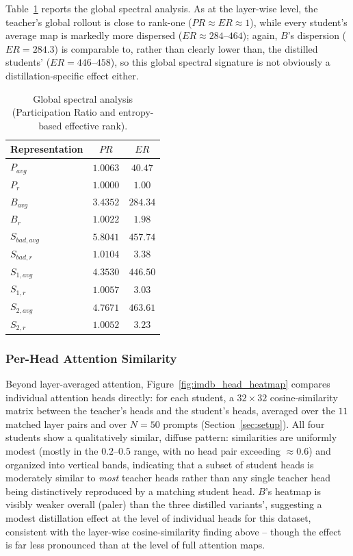 \documentclass[conference]{IEEEtran}
\begin{document}
Table~\ref{tab:imdb_global_spectral} reports the global spectral analysis. As at the layer-wise level, the teacher's global rollout is close to rank-one ($PR\approx ER\approx1$), while every student's average map is markedly more dispersed ($ER\approx284$--$464$); again, $B$'s dispersion ($ER=284.3$) is comparable to, rather than clearly lower than, the distilled students' ($ER=446$--$458$), so this global spectral signature is not obviously a distillation-specific effect either.

\begin{table}[h!]
\centering
\caption{Global spectral analysis (Participation Ratio and entropy-based effective rank).}
\begin{tabular}{|l|c|c|}
        \hline
        Representation & $PR$ & $ER$ \\
        \hline
        $P_{avg}$ & $1.0063$ & $40.47$ \\
        $P_r$ & $1.0000$ & $1.00$ \\
        $B_{avg}$ & $3.4352$ & $284.34$ \\
        $B_r$ & $1.0022$ & $1.98$ \\
        $S_{bad,avg}$ & $5.8041$ & $457.74$ \\
        $S_{bad,r}$ & $1.0104$ & $3.38$ \\
        $S_{1,avg}$ & $4.3530$ & $446.50$ \\
        $S_{1,r}$ & $1.0057$ & $3.03$ \\
        $S_{2,avg}$ & $4.7671$ & $463.61$ \\
        $S_{2,r}$ & $1.0052$ & $3.23$ \\
        \hline
    \end{tabular}
    \label{tab:imdb_global_spectral}
\end{table}

\subsubsection{Per-Head Attention Similarity}\label{sec:head-heatmaps}

Beyond layer-averaged attention, Figure~\ref{fig:imdb_head_heatmap} compares individual attention heads directly: for each student, a $32\times32$ cosine-similarity matrix between the teacher's heads and the student's heads, averaged over the $11$ matched layer pairs and over $N=50$ prompts (Section~\ref{sec:setup}). All four students show a qualitatively similar, diffuse pattern: similarities are uniformly modest (mostly in the $0.2$--$0.5$ range, with no head pair exceeding $\approx0.6$) and organized into vertical bands, indicating that a subset of student heads is moderately similar to \emph{most} teacher heads rather than any single teacher head being distinctively reproduced by a matching student head. $B$'s heatmap is visibly weaker overall (paler) than the three distilled variants', suggesting a modest distillation effect at the level of individual heads for this dataset, consistent with the layer-wise cosine-similarity finding above -- though the effect is far less pronounced than at the level of full attention maps.
\end{document}
